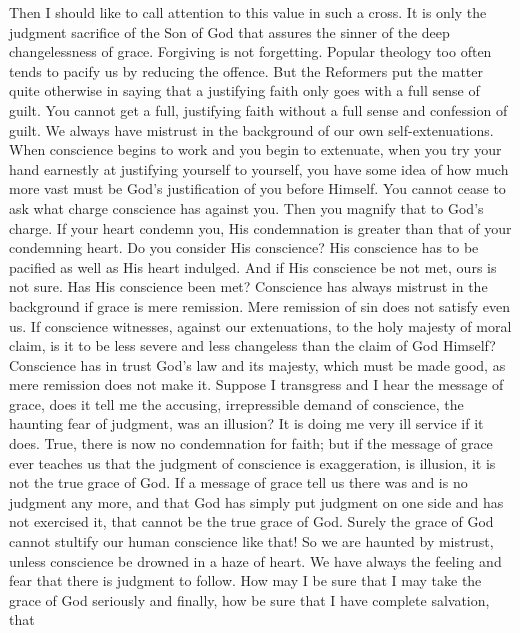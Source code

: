 \documentclass[12pt,a5paper,twoside,titlepage]{book}
\begin{document}
Then I should like to call attention to this 
value in such a cross. It is only the judgment 
sacrifice of the Son of God that assures the 
sinner of the deep changelessness of grace. 
Forgiving is not forgetting. Popular theology 
too often tends to pacify us by reducing the 
offence. But the Reformers put the matter quite 
otherwise in saying that a justifying faith only 
goes with a full sense of guilt. You cannot get 
a full, justifying faith without a full sense and 
confession of guilt. We always have mistrust 
in the background of our own self-extenuations. 
When conscience begins to work and you begin 
to extenuate, when you try your hand earnestly 
at justifying yourself to yourself, you have some 
idea of how much more vast must be God's 
justification of you before Himself. You cannot 
cease to ask what charge conscience has 
against you. Then you magnify that to God's 
charge. If your heart condemn you, His condemnation 
is greater than that of your condemning 
heart. Do you consider His conscience? 
His conscience has to be pacified as well as His 
heart indulged. And if His conscience be not 
met, ours is not sure. Has His conscience been 
met? Conscience has always mistrust in the 
background if grace is mere remission. Mere 
remission of sin does not satisfy even us. If 
conscience witnesses, against our extenuations, 
to the holy majesty of moral claim, is it to 
be less severe and less changeless than the 
claim of God Himself? Conscience has in trust 
God's law and its majesty, which must be made 
good, as mere remission does not make it. Suppose 
I transgress and I hear the message of 
grace, does it tell me the accusing, irrepressible 
demand of conscience, the haunting fear of 
judgment, was an illusion? It is doing me 
very ill service if it does. True, there is now 
no condemnation for faith; but if the message 
of grace ever teaches us that the judgment of 
conscience is exaggeration, is illusion, it is not 
the true grace of God. If a message of grace 
tell us there was and is no judgment any more, 
and that God has simply put judgment on 
one side and has not exercised it, that cannot 
be the true grace of God. Surely the grace of 
God cannot stultify our human conscience like 
that! So we are haunted by mistrust, unless 
conscience be drowned in a haze of heart. We 
have always the feeling and fear that there is 
judgment to follow. How may I be sure that I 
may take the grace of God seriously and finally, 
how be sure that I have complete salvation, that 
\end{document}
